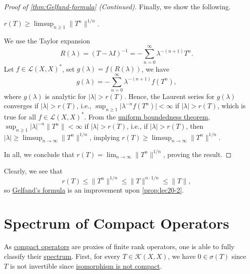 \begin{proof}[Proof of \autoref{thm:Gelfand-formula} (Continued)]
	Finally, we show the following.
	\begin{claim}
		\(r(T) \geq \limsup_{n \geq 1} \lVert T^n \rVert ^{1 / n} \).
	\end{claim}
	\begin{explanation}
		We use the Taylor expansion
		\[
			R(\lambda ) = (T - \lambda I)^{-1} = - \sum_{n=0}^{\infty} \lambda ^{-(n+1)}T^n.
		\]
		Let \(f\in \mathcal{L} (X, X)^{\ast} \), set \(g(\lambda ) = f(R(\lambda ))\), we have
		\[
			g(\lambda ) = - \sum_{n=0}^{\infty} \lambda ^{-(n+1)} f(T^n),
		\]
		where \(g(\lambda )\) is analytic for \(\vert \lambda  \vert > r(T)\). Hence, the Laurent series for \(g(\lambda )\) converges if \(\vert \lambda  \vert > r(T)\), i.e., \(\sup _{n\geq 1} \vert \lambda ^{-n} f(T^n) \vert < \infty\) if \(\vert \lambda  \vert > r(T)\), which is true for all \(f\in \mathcal{L} (X, X)^{\ast} \). From the \hyperref[thm:uniform-boundedness]{uniform boundedness theorem}, \(\sup _{n\geq 1} \vert \lambda  \vert^{-n} \lVert T^n \rVert < \infty\) if \(\vert \lambda  \vert > r(T) \), i.e., if \(\vert \lambda  \vert > r(T) \), then \(\vert \lambda \vert \geq \limsup_{n \to \infty} \lVert T^n \rVert ^{1 / n}\), implying \(r(T) \geq \limsup_{n \to \infty} \lVert T^n \rVert ^{1 / n}\).
	\end{explanation}

	In all, we conclude that \(r(T) = \lim_{n \to \infty} \lVert T^n \rVert ^{1 / n}\), proving the result.
\end{proof}

Clearly, we see that
\[
	r(T) \leq \lVert T^n \rVert ^{1 / n} \leq \lVert T \rVert ^{n\cdot 1 / n} \leq \lVert T \rVert,
\]
so \hyperref[thm:Gelfand-formula]{Gelfand's formula} is an improvement upon \autoref{prop:lec20-2}.

\section{Spectrum of Compact Operators}
As \hyperref[def:compact-op]{compact operators} are proxies of finite rank operators, one is able to fully classify their \hyperref[def:spectrum-point]{spectrum}. First, for every \(T\in \mathcal{K} (X, X)\), we have \(0\in \sigma (T)\) since \(T\) is not invertible since \hyperref[col:iso-are-not-compact]{isomorphism is not compact}.

